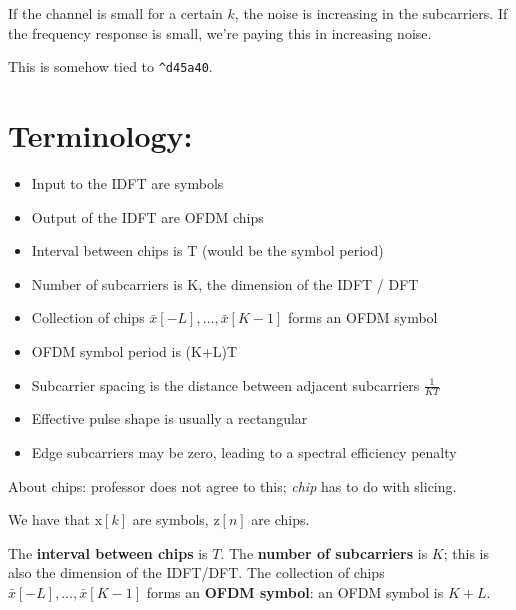 \documentclass[a4paper, 12pt]{book}
\begin{document}
\vspace{0.5cm}

If the channel is small for a certain $k$, the noise is increasing in the subcarriers. If the frequency response is small, we're paying this in increasing noise.

\noindent
\colorbox{teal!10}{
    \begin{minipage}{\linewidth}
        This is somehow tied to \texttt{\^{}d45a40}.
    \end{minipage}
}

\section*{Terminology:}

\begin{itemize}[label=\textcolor{red}{\small\faSquare}]
    \item Input to the IDFT are symbols
    \item Output of the IDFT are OFDM chips
    \item Interval between chips is T (would be the symbol period)
    \item Number of subcarriers is K, the dimension of the IDFT / DFT
    \item Collection of chips $\bar{x}[-L], \dots, \bar{x}[K-1]$ forms an OFDM symbol
    \item OFDM symbol period is (K+L)T
    \item Subcarrier spacing is the distance between adjacent subcarriers $\frac{1}{KT}$
    \item Effective pulse shape is usually a rectangular
    \item Edge subcarriers may be zero, leading to a spectral efficiency penalty
\end{itemize}

\vspace{0.5cm}

\noindent
\colorbox{teal!10}{
    \begin{minipage}{\linewidth}
        About chips: professor does not agree to this; \textit{chip} has to do with slicing.
    \end{minipage}
}

We have that $\mathrm{x}[k]$ are symbols, $\mathrm{z}[n]$ are chips.

The \textbf{interval between chips} is $T$.
The \textbf{number of subcarriers} is $K$; this is also the dimension of the IDFT/DFT.
The collection of chips $\bar{x}[-L], \dots, \bar{x}[K-1]$ forms an \textbf{OFDM symbol}: an OFDM symbol is $K+L$.
\end{document}
